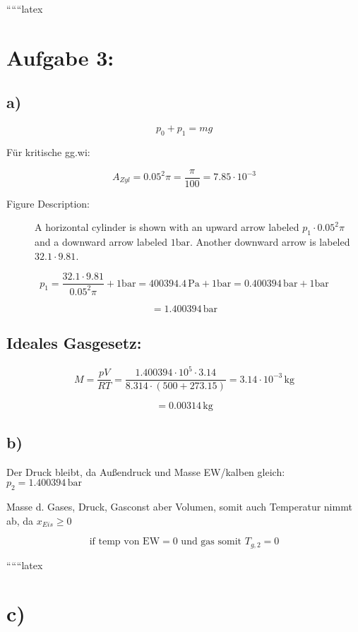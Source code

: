 
``````latex


\section*{Aufgabe 3:}

\subsection*{a)}

\[ p_0 + p_1 = mg \]

Für kritische gg.wi:

\[
A_{Zyl} = 0.05^2 \pi = \frac{\pi}{100} = 7.85 \cdot 10^{-3}
\]

\begin{description}
    \item[Figure Description:] A horizontal cylinder is shown with an upward arrow labeled \( p_1 \cdot 0.05^2 \pi \) and a downward arrow labeled \( 1 \text{bar} \). Another downward arrow is labeled \( 32.1 \cdot 9.81 \).
\end{description}

\[
p_1 = \frac{32.1 \cdot 9.81}{0.05^2 \pi} + 1 \text{bar} = 400394.4 \, \text{Pa} + 1 \text{bar} = 0.400394 \, \text{bar} + 1 \text{bar}
\]

\[
= 1.400394 \, \text{bar}
\]

\subsection*{Ideales Gasgesetz:}

\[
M = \frac{pV}{RT} = \frac{1.400394 \cdot 10^5 \cdot 3.14}{8.314 \cdot (500 + 273.15)} = 3.14 \cdot 10^{-3} \, \text{kg}
\]

\[
= 0.00314 \, \text{kg}
\]

\subsection*{b)}

Der Druck bleibt, da Außendruck und Masse EW/kalben gleich: \( p_2 = 1.400394 \, \text{bar} \)

Masse d. Gases, Druck, Gasconst aber Volumen, somit auch Temperatur nimmt ab, da \( x_{Eis} \geq 0 \)

\[
\text{if temp von EW} = 0 \text{ und gas somit } T_{g,2} = 0
\]

``````latex


\section*{c)}

